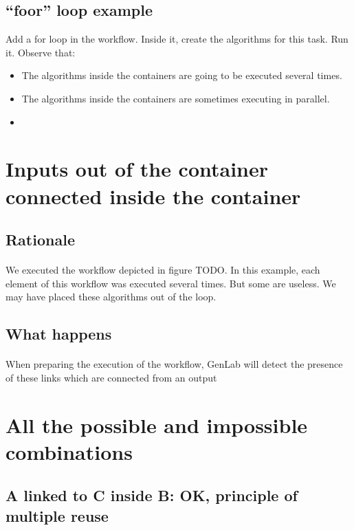 \documentclass[a4paper,10pt]{book}
\begin{document}
\subsection{``foor'' loop example}

Add a for loop in the workflow. Inside it, create the algorithms for this task. 
Run it. 
Observe that:
\begin{itemize}
\item The algorithms inside the containers are going to be executed several times.
\item The algorithms inside the containers are sometimes executing in parallel.
\item 
\end{itemize}

\section{Inputs out of the container connected inside the container}

\subsection{Rationale}

\paragraph*{}
We executed the workflow depicted in figure TODO.
In this example, each element of this workflow was executed several times.
But some are useless. We may have placed these algorithms out of the loop.


\subsection{What happens}

\paragraph*{}
When preparing the execution of the workflow, GenLab will detect the presence of these links which are connected from an output 


\section{All the possible and impossible combinations}

\subsection{A linked to C inside B: OK, principle of multiple reuse}
\end{document}
